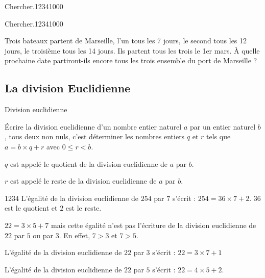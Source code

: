 {\begin{ExoDec}{Chercher.}{1234}{1}{0}{0}{0}
\end{ExoDec}
 
 
\begin{ExoDec}{Chercher.}{1234}{1}{0}{0}{0}

Trois bateaux partent de Marseille, l'un tous les 7 jours, le second tous les 12 jours, le troisième tous les 14 jours. Ils partent
tous les trois le 1er mars. À quelle prochaine date partiront-ils encore tous les trois ensemble du port de Marseille ?



\end{ExoDec} 
 
 
}


\begin{pageCours}




\section{La division Euclidienne}



\begin{DefT}{Division euclidienne}

Écrire la division euclidienne d'un nombre entier naturel $a$ par un entier naturel $b$, tous deux non nuls, c'est déterminer les nombres entiers $q$ et $r$ tels que $a = b \times q + r$ avec $0 \leq r <  b$.

$q$ est appelé le quotient de la division euclidienne de $a$ par $b$.

$r$ est appelé le reste de la division euclidienne de $a$ par $b$.
\end{DefT}


\begin{ExQr}{1234}
L'égalité de la division euclidienne de $254$ par $7$ s'écrit : $254 = 36 \times 7 +2$. $36$ est le quotient et $2$ est le reste.
\end{ExQr}


\begin{Att}

$22 = 3 \times 5 +7$ mais cette égalité n'est pas l'écriture de la division euclidienne de $22$ par $5$ ou par $3$. En effet, $7 > 3$ et $7 > 5$.

L'égalité de la division euclidienne de $22$ par $3$ s’écrit : $22 = 3 \times 7 +1$

L'égalité de la division euclidienne de $22$ par $5$ s’écrit : $22 = 4 \times 5 +2$.
\end{Att}


\end{pageCours}
